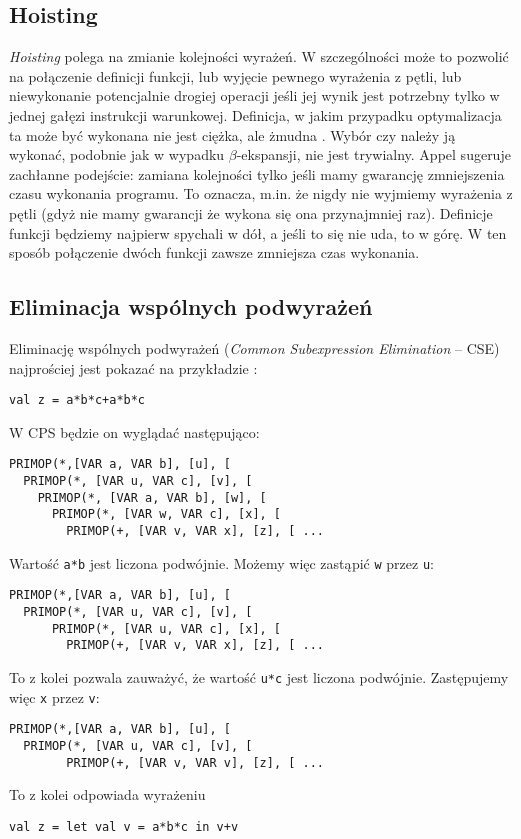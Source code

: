 \documentclass[11pt]{scrartcl}
\begin{document}
\subsection{Hoisting}
\textit{Hoisting} polega na zmianie kolejności wyrażeń. W szczególności może to pozwolić
na połączenie definicji funkcji, lub wyjęcie pewnego wyrażenia z pętli, lub
niewykonanie potencjalnie drogiej operacji jeśli jej wynik jest potrzebny tylko
w jednej gałęzi instrukcji warunkowej. Definicja, w jakim przypadku
optymalizacja ta może być wykonana nie jest ciężka, ale żmudna \cite[Chapter
8.2: Rules for hoisting]{Appel}. Wybór
czy należy ją wykonać, podobnie jak w wypadku $\beta$-ekspansji, nie jest
trywialny. Appel \cite[Chapter 8.3: Hoisting optimizations]{Appel} sugeruje
zachłanne podejście: zamiana kolejności tylko jeśli mamy gwarancję zmniejszenia
czasu wykonania programu. To oznacza, m.in. że nigdy nie wyjmiemy wyrażenia z pętli
(gdyż nie mamy gwarancji że wykona się ona przynajmniej raz). Definicje funkcji
będziemy najpierw spychali w dół, a jeśli to się nie uda, to w górę. W ten
sposób połączenie dwóch funkcji zawsze zmniejsza czas wykonania.


\subsection{Eliminacja wspólnych podwyrażeń}
Eliminację wspólnych podwyrażeń (\textit{Common Subexpression Elimination} --
CSE) najprościej jest pokazać na przykładzie \cite[Chapter 9: Common subexpressions]{Appel}:
\begin{lstlisting}
val z = a*b*c+a*b*c
\end{lstlisting}

W CPS będzie on wyglądać następująco:
\begin{lstlisting}
PRIMOP(*,[VAR a, VAR b], [u], [
  PRIMOP(*, [VAR u, VAR c], [v], [
    PRIMOP(*, [VAR a, VAR b], [w], [
      PRIMOP(*, [VAR w, VAR c], [x], [
        PRIMOP(+, [VAR v, VAR x], [z], [ ...
\end{lstlisting}

Wartość \lstinline|a*b| jest liczona podwójnie. Możemy więc zastąpić \lstinline|w| przez \lstinline|u|:
\begin{lstlisting}
PRIMOP(*,[VAR a, VAR b], [u], [
  PRIMOP(*, [VAR u, VAR c], [v], [
      PRIMOP(*, [VAR u, VAR c], [x], [
        PRIMOP(+, [VAR v, VAR x], [z], [ ...
\end{lstlisting}

To z kolei pozwala zauważyć, że wartość \lstinline|u*c| jest liczona podwójnie. Zastępujemy więc
\lstinline|x| przez \lstinline|v|:
\begin{lstlisting}
PRIMOP(*,[VAR a, VAR b], [u], [
  PRIMOP(*, [VAR u, VAR c], [v], [
        PRIMOP(+, [VAR v, VAR v], [z], [ ...
\end{lstlisting}
To z kolei odpowiada wyrażeniu
\begin{lstlisting}
val z = let val v = a*b*c in v+v
\end{lstlisting}
\end{document}
